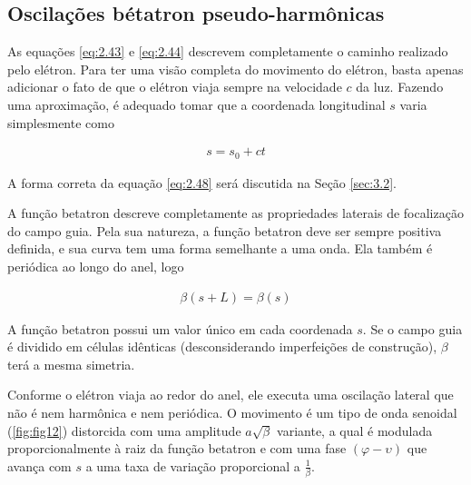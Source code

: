 \subsection{Oscilações bétatron pseudo-harmônicas}
As equações \eqref{eq:2.43} e \eqref{eq:2.44} descrevem completamente o caminho realizado pelo elétron. Para ter uma visão completa do movimento do elétron, basta apenas adicionar o fato de que o elétron viaja sempre na velocidade $c$ da luz. Fazendo uma aproximação, é adequado tomar que a coordenada longitudinal $s$ varia simplesmente como
	
\begin{align}
	s = s_0 + ct\label{eq:2.48}
\end{align}
	
A forma correta da equação \eqref{eq:2.48} será discutida na Seção \ref{sec:3.2}.
	
A função betatron descreve completamente as propriedades laterais de focalização do campo guia. Pela sua natureza, a função betatron deve ser sempre positiva definida, e sua curva tem uma forma semelhante a uma onda. Ela também é periódica ao longo do anel, logo
	
\begin{align}
	\beta(s+L) = \beta(s)
\end{align}
	
A função betatron possui um valor único em cada coordenada $s$. Se o campo guia é dividido em células idênticas (desconsiderando imperfeições de construção), $\beta$ terá a mesma simetria.
	
Conforme o elétron viaja ao redor do anel, ele executa uma oscilação lateral que não é nem harmônica e nem periódica. O movimento é um tipo de onda senoidal (\ref{fig:fig12}) distorcida com uma amplitude $a\sqrt{\beta}$ variante, a qual é modulada proporcionalmente à raiz da função betatron e com uma fase $(\varphi-\upsilon)$ que avança com $s$ a uma taxa de variação proporcional a $\frac{1}{\beta}$.
	
